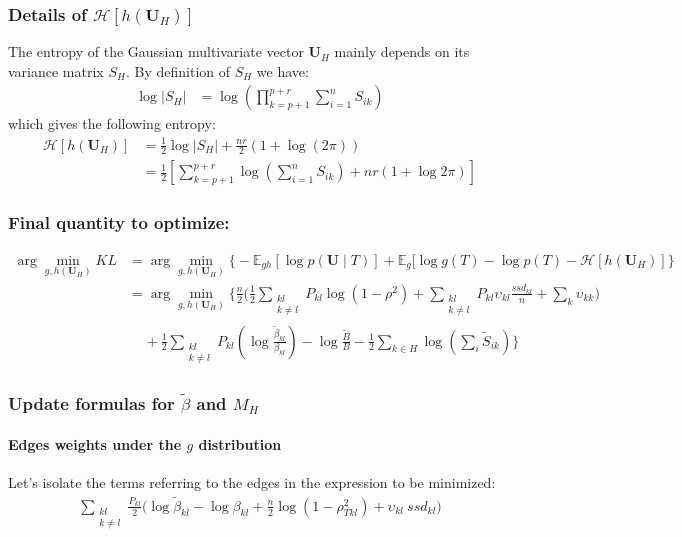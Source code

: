 \documentclass[11pt,a4paper]{article}
\newcommand{\argmin}{\arg\!\min}
\newcommand{\entr}{\mathcal{H}}
\newcommand{\Ubf}{\boldsymbol{U}}
\newcommand{\Esp}{\mathds{E}}
\begin{document}
 \subsubsection{Details of $\entr[h(\Ubf_H)]$}
 
 The entropy of the Gaussian multivariate vector $\Ubf_H$ mainly depends on its variance matrix $S_H$. By definition of $S_H$ we have:
 \begin{align*}
 \log |S_H| &= \log(\prod_{k=p+1}^{p+r} \sum_{i=1}^n S_{ik})
\end{align*}
which gives the following entropy:
\begin{align*}
\entr[h(\Ubf_H)]&= \frac{1}{2} \log |S_H| + \frac{nr}{2}(1+\log(2\pi))\\
 &=\frac{1}{2}\left[ \sum_{k=p+1}^{p+r} \log\left(\sum_{i=1}^n S_{ik}\right)+ nr(1+\log 2\pi )\right]
\end{align*}

\subsubsection{Final quantity to optimize:}
\begin{align*}
\argmin_{g,h(\Ubf_H)} KL  &=\argmin_{g,h(\Ubf_H)}  \Big\{-\Esp_{gh}[\log p(\Ubf \mid T) ] + \Esp_g[\log g(T) - \log p(T)-\entr[h(\Ubf_H)]\Big\}\\
&= \argmin_{g,h(\Ubf_H)}  \bigg\{ \frac{n}{2}\Big(\frac{1}{2}\sum _{\substack{kl\\ k \neq l}} P_{kl} \log (1-\rho^2) +  \sum_{\substack{kl\\ k \neq l}} P_{kl} \upsilon_{kl} \frac{ssd_{kl}}{n} +  \sum_{k} \upsilon_{kk} \Big)\\
& \;\;\;\; + \frac{1}{2}\sum_{\substack{kl\\ k\neq l}}P_{kl} \left(\log \frac{\widetilde{\beta}_{kl}}{{\beta}_{kl}}\right) - \log \frac{\widetilde{B}}{B} -\frac{1}{2}\sum_{k\in H} \log\left(\sum_i \widetilde{S}_{ik}\right) \bigg\}
\end{align*}
 
 
 \subsubsection{Update formulas for $\widetilde{\beta}$ and $M_H$ }

\paragraph{Edges weights under the $g$ distribution \\}
Let's isolate the terms referring to the edges in the expression to be minimized:
\begin{align*}
  \sum_{\substack{kl\\ k \neq l}} \frac{P_{kl}}{2}\Big(\log \widetilde{\beta}_{kl} - \log \beta_{kl} + \frac{n}{2} \log (1-\rho_{Tkl}^2) + \upsilon_{kl}\: ssd_{kl} \Big)   
\end{align*}
\end{document}

